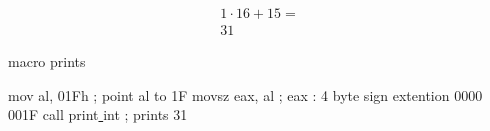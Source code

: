 \documentclass[12pt]{article}
\begin{document}
\begin{enumerate}
\begin{itemize}
       \begin{align*}
           1 \cdot 16 + 15 =\\
           31
       \end{align*}
                \begin{algorithm}
   \caption{macro prints}
   \begin{algorithmic}[1]
   \State mov al, 01Fh ; point al to 1F
    \State movsz eax, al ; eax : 4 byte sign extention  0000 001F 
    \State call print\underline{ }int ; prints 31
   \end{algorithmic}
   \end{algorithm}
   \end{itemize}
\end{enumerate}
\end{document}
